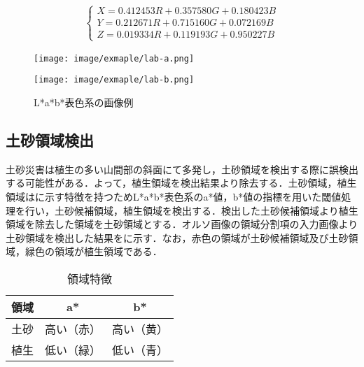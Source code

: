       \begin{eqnarray}
        \label{XYZ表色系}
        \left\{
          \begin{array}{l}
            X = 0.412453R + 0.357580G + 0.180423B \\
            Y = 0.212671R + 0.715160G + 0.072169B \\
            Z = 0.019334R + 0.119193G + 0.950227B
          \end{array}
        \right.
      \end{eqnarray}

      \begin{figure}[t]
        \begin{minipage}[c]{0.45\hsize}
          \centering
          \texttt{[image: image/exmaple/lab-a.png]}
        \end{minipage}
        \begin{minipage}[c]{0.45\hsize}
          \centering
          \texttt{[image: image/exmaple/lab-b.png]}
        \end{minipage}
        \caption{L*a*b*表色系の画像例}
        \label{Lab画像}
      \end{figure}


    \subsection{土砂領域検出}
      \label{土砂領域検出}
      土砂災害は植生の多い山間部の斜面にて多発し，土砂領域を検出する際に誤検出する可能性がある．よって，植生領域を検出結果より除去する．土砂領域，植生領域はに示す特徴を持つためL*a*b*表色系のa*値，b*値の指標を用いた閾値処理を行い，土砂候補領域，植生領域を検出する．検出した土砂候補領域より植生領域を除去した領域を土砂領域とする．{オルソ画像の領域分割}項の入力画像より土砂領域を検出した結果をに示す．なお，赤色の領域が土砂候補領域及び土砂領域，緑色の領域が植生領域である．

      \begin{table}[b]
        \centering
        \caption{領域特徴}
        \label{領域特徴}
        \begin{tabular}{ccc}
          \hline
          \textbf{領域} & \textbf{a*} & \textbf{b*} \\
          \hline  \hline
          土砂 & 高い（赤） & 高い（黄） \\
          植生 & 低い（緑） & 低い（青） \\ \hline
        \end{tabular}
      \end{table}
      
